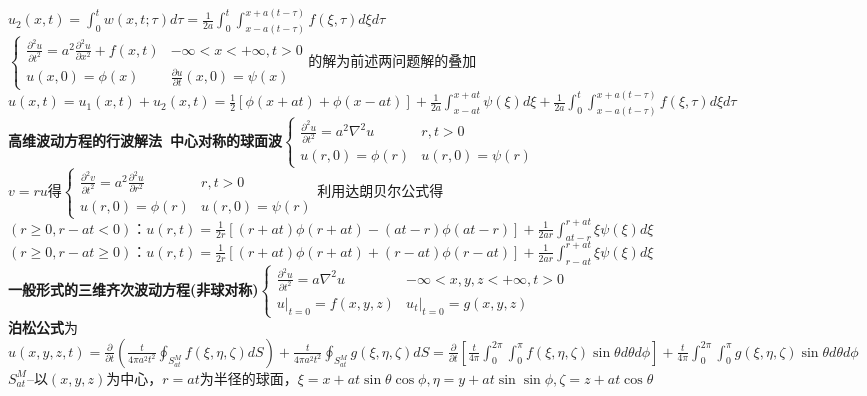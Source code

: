 \documentclass[10pt,a4paper]{article}
\begin{document}
\begin{multicols}{2}
\indent\indent$u_2(x,t)=\int_0^tw(x,t;\tau)d\tau=\frac{1}{2a}\int_0^t\int_{x-a(t-\tau)}^{x+a(t-\tau)}f(\xi,\tau)d\xi d\tau$\\
$\left\{\begin{array}{ll}\frac{\partial^2u}{\partial t^2}=a^2\frac{\partial^2u}{\partial x^2}+f(x,t)&-\infty<x<+\infty,t>0\\u(x,0)=\phi(x)&\frac{\partial u}{\partial t}(x,0)=\psi(x)\end{array}\right.$的解为前述两问题解的叠加$u(x,t)=u_1(x,t)+u_2(x,t)=\frac{1}{2}[\phi(x+at)+\phi(x-at)]+\frac{1}{2a}\int_{x-at}^{x+at}\psi(\xi)d\xi+\frac{1}{2a}\int_0^t\int_{x-a(t-\tau)}^{x+a(t-\tau)}f(\xi,\tau)d\xi d\tau$\\
\textbf{高维波动方程的行波解法~中心对称的球面波}$\left\{\begin{array}{ll}\frac{\partial^2u}{\partial t^2}=a^2\nabla^2u&r,t>0\\u(r,0)=\phi(r)&u(r,0)=\psi(r)\end{array}\right.$\\
$v=ru$得$\left\{\begin{array}{ll}\frac{\partial^2v}{\partial t^2}=a^2\frac{\partial^2u}{\partial r^2}&r,t>0\\u(r,0)=\phi(r)&u(r,0)=\psi(r)\end{array}\right.$利用达朗贝尔公式得\\
$(r\geq0,r-at<0)$：$u(r,t)=\frac{1}{2r}[(r+at)\phi(r+at)-(at-r)\phi(at-r)]+\frac{1}{2ar}\int_{at-r}^{r+at}\xi\psi(\xi)d\xi$\\
$(r\geq0,r-at\geq0)$：$u(r,t)=\frac{1}{2r}[(r+at)\phi(r+at)+(r-at)\phi(r-at)]+\frac{1}{2ar}\int_{r-at}^{r+at}\xi\psi(\xi)d\xi$\\
\indent\textbf{一般形式的三维齐次波动方程(非球对称)}$\left\{\begin{array}{ll}\frac{\partial^2u}{\partial t^2}=a\nabla^2u&-\infty<x,y,z<+\infty,t>0\\u|_{t=0}=f(x,y,z)&u_t|_{t=0}=g(x,y,z)\end{array}\right.$\\
\indent\textbf{泊松公式}为$u(x,y,z,t)=\frac{\partial}{\partial t}(\frac{t}{4\pi a^2t^2}\oint_{S_{at}^M}f(\xi,\eta,\zeta)dS)+\frac{t}{4\pi a^2t^2}\oint_{S_{at}^M}g(\xi,\eta,\zeta)dS=\frac{\partial}{\partial t}[\frac{t}{4\pi}\int_0^{2\pi}\int_0^{\pi}f(\xi,\eta,\zeta)\sin\theta d\theta d\phi]+\frac{t}{4\pi}\int_0^{2\pi}\int_0^{\pi}g(\xi,\eta,\zeta)\sin\theta d\theta d\phi$\\
$S_{at}^M$--以$(x,y,z)$为中心，$r=at$为半径的球面，$\xi=x+at\sin\theta\cos\phi,\eta=y+at\sin\sin\phi,\zeta=z+at\cos\theta$\\

\end{multicols}
\end{document}
